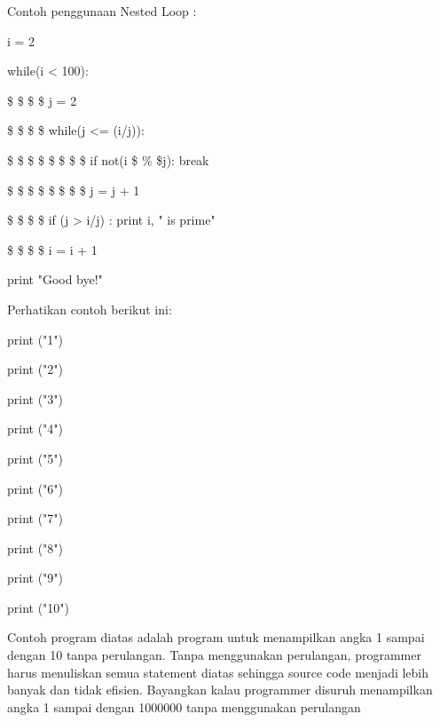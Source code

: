 Contoh penggunaan Nested Loop : \par
\vspace{\baselineskip}
\vspace{\baselineskip}
i = 2 \par
\vspace{\baselineskip}
while(i < 100): \par
\vspace{\baselineskip}
 \$  \$  \$  \$ j = 2 \par
\vspace{\baselineskip}
 \$  \$  \$  \$ while(j <= (i/j)): \par
\vspace{\baselineskip}
 \$  \$  \$  \$  \$  \$  \$  \$ if not(i \$  \%  \$j): break \par
\vspace{\baselineskip}
 \$  \$  \$  \$  \$  \$  \$  \$ j = j + 1 \par
\vspace{\baselineskip}
 \$  \$  \$  \$ if (j > i/j) : print i, " is prime" \par
\vspace{\baselineskip}
 \$  \$  \$  \$ i = i + 1 \par
\vspace{\baselineskip}
\vspace{\baselineskip}
print "Good bye!" \par
\vspace{12pt}
\vspace{12pt}
Perhatikan contoh berikut ini:\vspace{\baselineskip}
\vspace{\baselineskip}
 \par
\vspace{12pt}
print ("1") \par
print ("2") \par
print ("3") \par
print ("4") \par
print ("5") \par
print ("6") \par
print ("7") \par
print ("8") \par
print ("9") \par
print ("10") \par
\vspace{12pt}
\vspace{\baselineskip}

Contoh program diatas adalah program untuk menampilkan angka 1 sampai dengan 10 tanpa perulangan. Tanpa menggunakan perulangan, programmer harus menuliskan semua statement diatas sehingga source code menjadi lebih banyak dan tidak efisien. Bayangkan kalau programmer disuruh menampilkan angka 1 sampai dengan 1000000 tanpa menggunakan perulangan\vspace{\baselineskip}
\vspace{\baselineskip}

